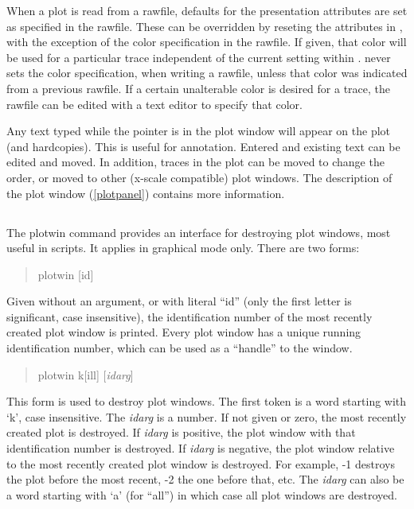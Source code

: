 When a plot is read from a rawfile, defaults for the presentation
attributes are set as specified in the rawfile.  These can be
overridden by reseting the attributes in {\WRspice}, with the exception
of the color specification in the rawfile.  If given, that color will
be used for a particular trace independent of the current setting
within {\WRspice}.  {\WRspice} never sets the color specification, when
writing a rawfile, unless that color was indicated from a previous
rawfile.  If a certain unalterable color is desired for a trace, the
rawfile can be edited with a text editor to specify that color.

Any text typed while the pointer is in the plot window will appear on
the plot (and hardcopies).  This is useful for annotation.  Entered
and existing text can be edited and moved.  In addition, traces in the
plot can be moved to change the order, or moved to other (x-scale
compatible) plot windows.  The description of the plot window
(\ref{plotpanel}) contains more information.


\subsection{}


The {\cb plotwin} command provides an interface for destroying plot
windows, most useful in scripts.  It applies in graphical mode only. 
There are two forms:
 
\begin{quote}
{\vt plotwin} [{\vt id}]
\end{quote}
 
Given without an argument, or with literal ``{\vt id}'' (only the
first letter is significant, case insensitive), the identification
number of the most recently created plot window is printed.  Every
plot window has a unique running identification number, which can be
used as a ``handle'' to the window.
 
\begin{quote}
{\vt plotwin} {\vt k}[{\vt ill}] [{\it idarg\/}]
\end{quote}
 
This form is used to destroy plot windows.  The first token is a word
starting with `{\vt k}', case insensitive.  The {\it idarg} is a
number.  If not given or zero, the most recently created plot is
destroyed.  If {\it idarg} is positive, the plot window with that
identification number is destroyed.  If {\it idarg} is negative, the
plot window relative to the most recently created plot window is
destroyed.  For example, -1 destroys the plot before the most recent,
-2 the one before that, etc.  The {\it idarg} can also be a word
starting with `{\vt a}' (for ``{\vt all}'') in which case all plot
windows are destroyed.


